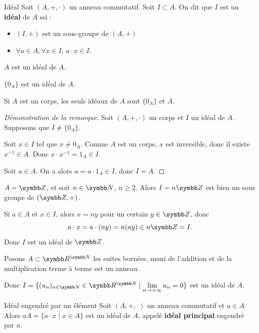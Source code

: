 \lvspace \avspace \begin{definition}{Idéal}{}
    Soit $(A, +, \cdot)$ un anneau commutatif. Soit $I \subset A$. On dit que $I$ est un \textbf{idéal} de $A$ ssi :
    \begin{itemize}
        \item $(I, +)$ est un sous-groupe de $(A, +)$ 
        \item $\forall a \in A, \forall x \in I, \, a \cdot x \in I$.
    \end{itemize}
\end{definition}

\begin{exemple}
    $A$ est un idéal de $A$.

    $\{0_A\}$ est un idéal de $A$.
\end{exemple}

\begin{remarque}
    Si $A$ est un corps, les seuls idéaux de $A$ sont $\{0_A\}$ et $A$.
\end{remarque}

\begin{proof}[Démonstration de la remarque]

    Soit $(A, +, \cdot)$ un corps et $I$ un idéal de $A$. Supposons que $I \neq \{0_A\}$.

    Soit $x \in I$ tel que $x \neq 0_A$. Comme $A$ est un corps, $x$ est inversible, donc
    il existe $x^{-1} \in A$. Donc $x \cdot x^{-1} = 1_A \in I$.

    Soit $a \in A$. On a alors $a = a \cdot 1_A \in I$, donc $I = A$.
\end{proof}

\begin{exemple}
    $A = \Z$, et soit $n \in \N$, $n \geqslant 2$. Alors $I = n\Z$ est bien un sous groupe de $(\Z, +)$.

    Si $a \in A$ et $x \in I$, alors $x = ny$ pour un certain $y \in \Z$, donc
    \[
        a \cdot x = a \cdot (ny) = n(ay) \in n\Z = I.
    \]
    Donc $I$ est un idéal de $\Z$.

    \lvspace Posons $A \subset \R^{\N}$ les suites bornées, muni de l'addition et de la multiplication terme à terme
    est un anneau.

    Donc $I = \{(u_n)_{n \in \N} \in \R^{\N} \mid \lim\limits_{n \to +\infty} u_n = 0\}$ est un idéal de $A$.


\end{exemple}

\begin{theoreme}{Idéal engendré par un élément}{}
    Soit $(A, +, \cdot)$ un anneau commutatif et $a \in A$. Alors
    $aA = \{a \cdot x \mid x \in A\}$ est un idéal de $A$, appelé
    \textbf{idéal principal} engendré par $a$.
    
\end{theoreme}

